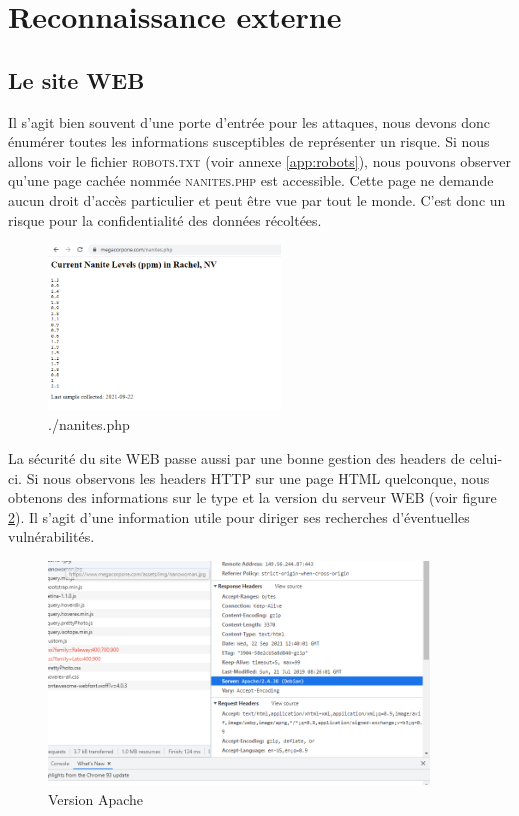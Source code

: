 \documentclass[a4paper]{article}
\begin{document}
\newpage
\section{Reconnaissance externe} \label{sec:reconnaissance}
\subsection{Le site WEB}\label{sec:WEB}
Il s'agit bien souvent d'une porte d'entrée pour les attaques, nous devons donc énumérer toutes les informations susceptibles de représenter un risque. Si nous allons voir le fichier \textsc{robots.txt} (voir annexe \ref{app:robots}), nous pouvons observer qu'une page cachée nommée \textsc{nanites.php} est accessible. Cette page ne demande aucun droit d'accès particulier et peut être vue par tout le monde. C'est donc un risque pour la confidentialité des données récoltées.

\begin{figure}[H]
    \centering
    \includegraphics[width=0.55\textwidth]{images/lab1/nanite.PNG}
    \caption{./nanites.php}
    \label{fig:nanites.php}
\end{figure}

La sécurité du site WEB passe aussi par une bonne gestion des headers de celui-ci. Si nous observons les headers HTTP sur une page HTML quelconque, nous obtenons des informations sur le type et la version du serveur WEB (voir figure \ref{fig:versionapache}). Il s'agit d'une information utile pour diriger ses recherches d'éventuelles vulnérabilités.

\begin{figure}[H]
    \centering
    \includegraphics[width=0.90\textwidth]{images/lab1/version.PNG}
    \caption{Version Apache}
    \label{fig:versionapache}
\end{figure}
\end{document}
